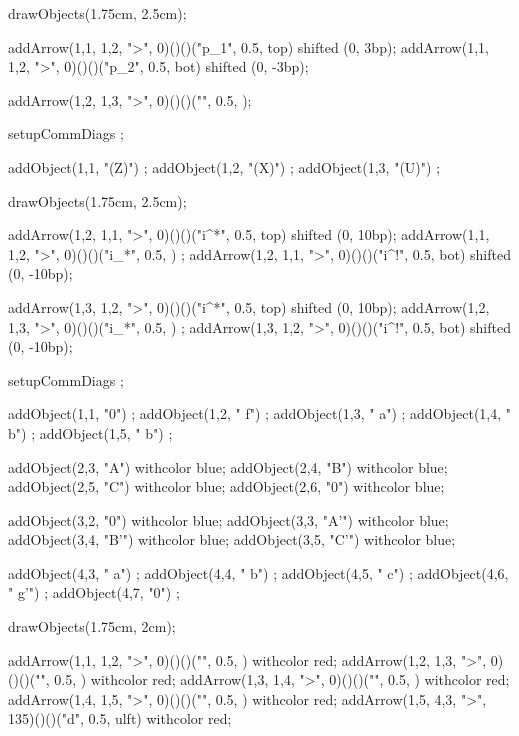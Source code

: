   drawObjects(1.75cm, 2.5cm);
  
  addArrow(1,1, 1,2, ">", 0)()()("p_1", 0.5, top) shifted (0, 3bp);
  addArrow(1,1, 1,2, ">", 0)()()("p_2", 0.5, bot) shifted (0, -3bp);
  
  addArrow(1,2, 1,3, ">", 0)()()("", 0.5, );
\stopMPcode\stopformula
\stopbuffer

\processTEXbuffer

\typebuffer

\startbuffer
\startformula{}
  setupCommDiags ;
  
  addObject(1,1, "(Z)") ;
  addObject(1,2, "(X)") ;
  addObject(1,3, "(U)") ;
    
  drawObjects(1.75cm, 2.5cm);
  
  addArrow(1,2, 1,1, ">", 0)()()("i^*", 0.5, top) shifted (0, 10bp);
  addArrow(1,1, 1,2, ">", 0)()()("i_*", 0.5,    ) ;
  addArrow(1,2, 1,1, ">", 0)()()("i^!", 0.5, bot) shifted (0, -10bp);
  
  addArrow(1,3, 1,2, ">", 0)()()("i^*", 0.5, top) shifted (0, 10bp);
  addArrow(1,2, 1,3, ">", 0)()()("i_*", 0.5,    ) ;
  addArrow(1,3, 1,2, ">", 0)()()("i^!", 0.5, bot) shifted (0, -10bp);
\stopMPcode\stopformula
\stopbuffer

\processTEXbuffer

\typebuffer

\startbuffer
\startformula{}
  setupCommDiags ;
  
  addObject(1,1, "0") ;
  addObject(1,2, "\; f") ;
  addObject(1,3, "\: a") ;
  addObject(1,4, "\: b") ;
  addObject(1,5, "\: b") ;

  addObject(2,3, "A") withcolor blue;
  addObject(2,4, "B") withcolor blue;
  addObject(2,5, "C") withcolor blue;
  addObject(2,6, "0") withcolor blue;
  
  addObject(3,2, "0")  withcolor blue;
  addObject(3,3, "A'") withcolor blue;
  addObject(3,4, "B'") withcolor blue;
  addObject(3,5, "C'") withcolor blue;

  addObject(4,3, "\: a") ;
  addObject(4,4, "\: b") ;
  addObject(4,5, "\: c") ;
  addObject(4,6, "\: g'") ;
  addObject(4,7, "0") ;
    
  drawObjects(1.75cm, 2cm);
  
  addArrow(1,1, 1,2, ">", 0)()()("", 0.5, ) withcolor red;
  addArrow(1,2, 1,3, ">", 0)()()("", 0.5, ) withcolor red;
  addArrow(1,3, 1,4, ">", 0)()()("", 0.5, ) withcolor red;
  addArrow(1,4, 1,5, ">", 0)()()("", 0.5, ) withcolor red;
  addArrow(1,5, 4,3, ">", 135)()()("d", 0.5, ulft) withcolor red;
  
